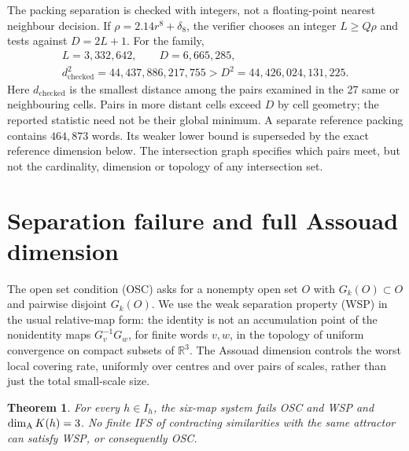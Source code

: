 \documentclass[11pt,a4paper]{article}
\newtheorem{theorem}{Theorem}[section]
\theoremstyle{definition}\newtheorem{definition}[theorem]{Definition}
\theoremstyle{remark}\newtheorem{remark}[theorem]{Remark}
\newcommand{\R}{\mathbb R}\newcommand{\Z}{\mathbb Z}
\begin{document}
The packing separation is checked with integers, not a floating-point nearest
neighbour decision. If $\rho=2.14r^8+\delta_8$, the verifier chooses an
integer $L\ge Q\rho$ and tests against $D=2L+1$. For the family,
\begin{gather*}
L=3,332,642,\qquad D=6,665,285,\\
d_{\mathrm{checked}}^2=44,437,886,217,755>D^2=44,426,024,131,225.
\end{gather*}
Here $d_{\mathrm{checked}}$ is the smallest distance among the pairs examined
in the 27 same or neighbouring cells. Pairs in more distant cells exceed
$D$ by cell geometry; the reported statistic need not be their global minimum.
A separate
reference packing contains $464,873$ words. Its weaker lower bound is
superseded by the exact reference dimension below.
The intersection graph specifies which pairs meet, but not the cardinality,
dimension or topology of any intersection set.

\section{Separation failure and full Assouad dimension}\label{sec:assouad}
The open set condition (OSC) asks for a nonempty open set $O$ with
$G_k(O)\subset O$ and pairwise disjoint $G_k(O)$. We use the weak separation
property (WSP) in the usual relative-map form: the identity is not an
accumulation point of the nonidentity maps $G_v^{-1}G_w$, for finite words
$v,w$, in the topology of uniform convergence on compact subsets of $\R^3$.
The Assouad dimension controls the worst local covering rate, uniformly over
centres and over pairs of scales, rather than just the total small-scale size.

\begin{theorem}\label{thm:assouad}
For every $h\in I_h$, the six-map system fails OSC and WSP and
$\dim_{\mathrm A} K(h)=3$. No finite IFS of contracting similarities with the same
attractor can satisfy WSP, or consequently OSC.
\end{theorem}
\end{document}
